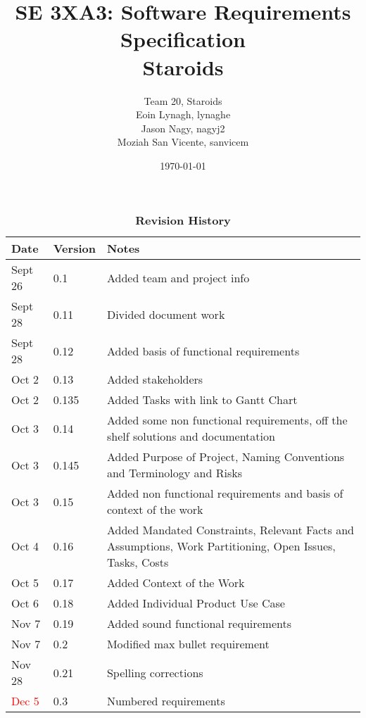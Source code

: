 \documentclass[12pt, titlepage]{article}
\title{SE 3XA3: Software Requirements Specification\\Staroids}
\author{Team 20, Staroids
		\\ Eoin Lynagh, lynaghe
		\\ Jason Nagy, nagyj2
		\\ Moziah San Vicente, sanvicem
}
\date{\today}
\begin{document}
\maketitle

\tableofcontents
\listoftables

\begin{table}[bp]
\caption{\bf Revision History}
\begin{tabularx}{\textwidth}{p{3cm}p{2cm}X}
\toprule {\bf Date} & {\bf Version} & {\bf Notes}\\
\midrule
Sept 26 & 0.1 & Added team and project info\\
Sept 28 & 0.11 & Divided document work\\
Sept 28 & 0.12 & Added basis of functional requirements\\
Oct 2 & 0.13 & Added stakeholders\\
Oct 2 & 0.135 & Added Tasks with link to Gantt Chart\\
Oct 3 & 0.14 & Added some non functional requirements, off the shelf solutions and documentation\\
Oct 3 & 0.145 & Added Purpose of Project, Naming Conventions and Terminology and Risks\\
Oct 3 & 0.15 & Added non functional requirements and basis of context of the work\\
Oct 4 & 0.16 & Added Mandated Constraints, Relevant Facts and Assumptions, Work Partitioning, Open Issues, Tasks, Costs\\
Oct 5 & 0.17 & Added Context of the Work\\
Oct 6 & 0.18 & Added Individual Product Use Case\\
Nov 7 & 0.19 & Added sound functional requirements\\
Nov 7 & 0.2 & Modified max bullet requirement\\
Nov 28 & 0.21 & Spelling corrections\\
\textcolor{red}{Dec 5} & 0.3 & Numbered requirements\\
\bottomrule
\end{tabularx}
\end{table}

\newpage


\end{document}

